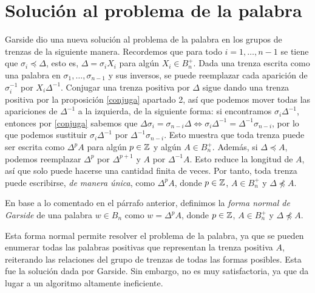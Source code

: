 \documentclass[TFG.tex]{subfiles}
\begin{document}
\section{Solución al problema de la palabra}
Garside dio una nueva solución al problema de la palabra en los grupos de trenzas de la siguiente manera. Recordemos que para todo $i=1,\dots, n-1$ se tiene que $\sigma_i\preccurlyeq\Delta$, esto es, $\Delta=\sigma_iX_i$ para algún $X_i\in B_n^+$. Dada una trenza escrita como una palabra en $\sigma_1,\dots,\sigma_{n-1}$ y sus inversos, se puede reemplazar cada aparición de $\sigma_i^{-1}$ por $X_i\Delta^{-1}$. Conjugar una trenza positiva por $\Delta$ sigue dando una trenza positiva por la proposición \ref{conjuga} apartado 2, así que podemos mover todas las apariciones de $\Delta^{-1}$ a la izquierda, de la siguiente forma: si encontramos $\sigma_i\Delta^{-1}$, entonces por \ref{conjuga} sabemos que $\Delta\sigma_{i}=\sigma_{n-i}\Delta\Leftrightarrow  \sigma_i\Delta^{-1}=\Delta^{-1}\sigma_{n-i}$, por lo que podemos sustituir $\sigma_i\Delta^{-1}$ por $\Delta^{-1}\sigma_{n-i}$. Esto muestra que toda trenza puede ser escrita como $\Delta^p A$ para algún $p\in\mathbb{Z}$ y algún $A\in B_n^+$. Además, si $\Delta\preccurlyeq A$, podemos reemplazar $\Delta^p$ por $\Delta^{p+1}$ y $A$ por $\Delta^{-1}A$. Esto reduce la longitud de $A$, así que solo puede hacerse una cantidad finita de veces. Por tanto, toda trenza puede escribirse, \emph{de manera única}, como $\Delta^pA$, donde $p\in\mathbb{Z}$, $A\in B_n^+$ y $\Delta\not\preccurlyeq A$. 

\begin{defi}
En base a lo comentado en el párrafo anterior, definimos la \emph{forma normal de Garside} de una palabra $w\in B_n$ como $w=\Delta^pA$, donde $p\in\mathbb{Z}$, $A\in B_n^+$ y $\Delta\not\preccurlyeq A$. 
\end{defi}


Esta forma normal permite resolver el problema de la palabra, ya que se pueden enumerar todas las palabras positivas que representan la trenza positiva $A$, reiterando las relaciones del grupo de trenzas de todas las formas posibles. Esta fue la solución dada por Garside. Sin embargo, no es muy satisfactoria, ya que da lugar a un algoritmo altamente ineficiente.
\end{document}

